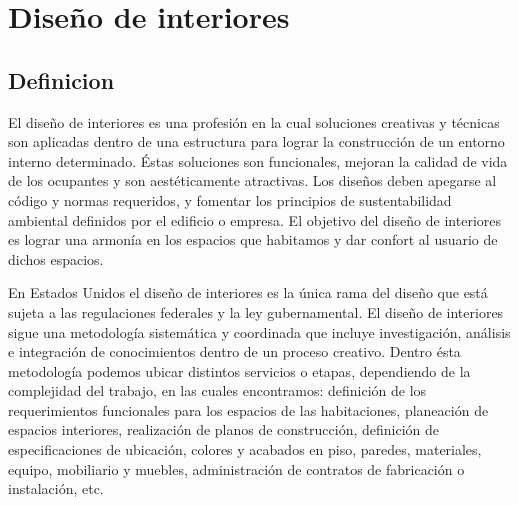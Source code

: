 \section{Diseño de interiores}
\subsection{Definicion}
El diseño de interiores es una profesión en la cual soluciones creativas y técnicas son aplicadas dentro de una estructura para lograr la construcción de un entorno interno determinado. Éstas soluciones son funcionales, mejoran la calidad de vida de los ocupantes y son aestéticamente atractivas. Los diseños deben apegarse al código y normas requeridos, y fomentar los principios de sustentabilidad ambiental definidos por el edificio o empresa. El objetivo del diseño de interiores es lograr una armonía en los espacios que habitamos y dar confort al usuario de dichos espacios\cite{B01}. \par
En Estados Unidos el diseño de interiores es la única rama del diseño que está sujeta a las regulaciones federales y la ley gubernamental\cite{B02}.
El diseño de interiores sigue una metodología sistemática y coordinada que incluye investigación, análisis e integración de conocimientos dentro de un proceso creativo. Dentro ésta metodología podemos ubicar distintos servicios o etapas, dependiendo de la complejidad del trabajo, en las cuales encontramos: definición de los requerimientos funcionales para los espacios de las habitaciones, planeación de espacios interiores, realización de planos de construcción, definición de especificaciones de ubicación, colores y acabados en piso, paredes, materiales, equipo, mobiliario y muebles, administración de contratos de fabricación o instalación, etc.\par


